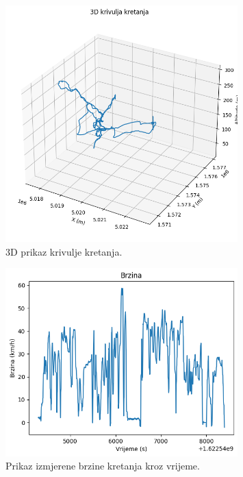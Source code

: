 \begin{figure}
    \centering
    \includegraphics[width=0.8\textwidth]{images/path_3d.png}
    \caption{3D prikaz krivulje kretanja.}
    \label{fig:a:3d}
\end{figure}

\begin{figure}
    \centering
    \includegraphics[width=0.8\textwidth]{images/speed.png}
    \caption{Prikaz izmjerene brzine kretanja kroz vrijeme.}
    \label{fig:a:speed}
\end{figure}

